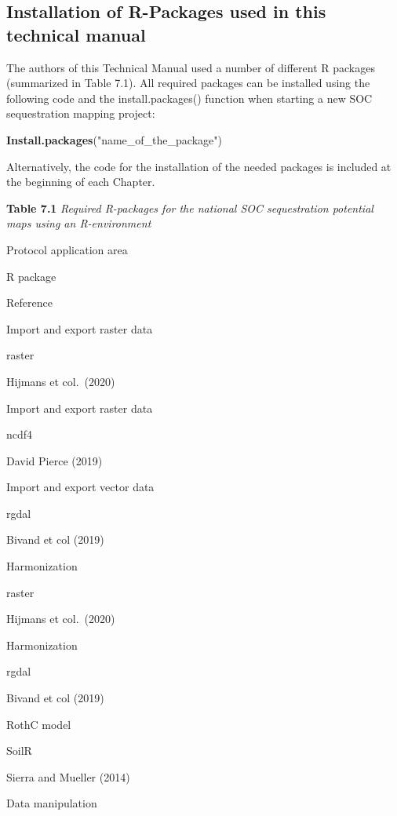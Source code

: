 \documentclass[
  10pt,
  b5paper,
]{book}
\newenvironment{Shaded}{\begin{snugshade}}{\end{snugshade}}
\newcommand{\KeywordTok}[1]{\textcolor[rgb]{0.13,0.29,0.53}{\textbf{#1}}}
\newcommand{\NormalTok}[1]{#1}
\newcommand{\StringTok}[1]{\textcolor[rgb]{0.31,0.60,0.02}{#1}}
\begin{document}
\hypertarget{installation-of-r-packages-used-in-this-technical-manual}{%
\subsection{Installation of R-Packages used in this technical manual}\label{installation-of-r-packages-used-in-this-technical-manual}}

The authors of this Technical Manual used a number of different R packages (summarized in Table 7.1). All required packages can be installed using the following code and the install.packages() function when starting a new SOC sequestration mapping project:

\begin{Shaded}
\begin{Highlighting}[]
\KeywordTok{Install.packages}\NormalTok{(}\StringTok{"name_of_the_package"}\NormalTok{)}
\end{Highlighting}
\end{Shaded}

Alternatively, the code for the installation of the needed packages is included at the beginning of each Chapter.

\textbf{Table 7.1} \emph{Required R-packages for the national SOC sequestration potential maps using an R-environment}

Protocol application area

R package

Reference

Import and export raster data

raster

Hijmans et col.~(2020)

Import and export raster data

ncdf4

David Pierce (2019)

Import and export vector data

rgdal

Bivand et col (2019)

Harmonization

raster

Hijmans et col.~(2020)

Harmonization

rgdal

Bivand et col (2019)

RothC model

SoilR

Sierra and Mueller (2014)

Data manipulation
\end{document}
